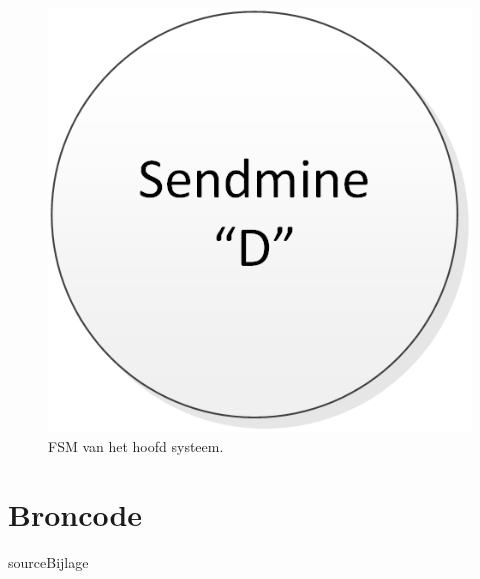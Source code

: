 \documentclass{report}
\begin{document}
\begin{figure}[H]
\caption{FSM van het hoofd systeem.}
\label{fig:fsmMain}
\includegraphics[width=0.8\linewidth]{FSMMain}
\end{figure}

\section{Broncode}
{sourceBijlage}
\end{document}
